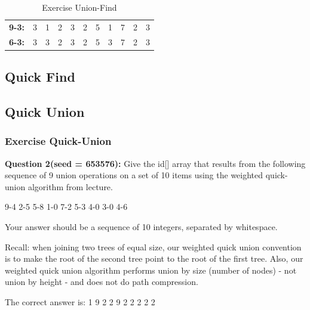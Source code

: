 \documentclass[paper=a4, fontsize=11pt]{scrartcl} %
\numberwithin{equation}{section} %
\numberwithin{figure}{section} %
\numberwithin{table}{section} %
\begin{document}
\begin{table}[]
\begin{tabular}{|c|ccllllllll}
\textbf{9-3:} & 3                      & 1                      & 2                               & 3                               & 2                               & 5                               & 1                               & 7                               & 2                               & 3                               \\ \cline{1-1}
\textbf{6-3:} & 3                      & 3                      & 2                               & 3                               & 2                               & 5                               & 3                               & 7                               & 2                               & 3                               \\ \cline{1-1}
\end{tabular}
\label{tab:union-find}
\caption{Exercise Union-Find}
\end{table}
\subsection{Quick Find}


\subsection{Quick Union}
\subsubsection{Exercise Quick-Union}
\textbf{Question 2(seed = 653576):}
Give the id[] array that results from the following sequence of 9 union
operations on a set of 10 items using the weighted quick-union algorithm from lecture.
\begin{center}
9-4 2-5 5-8 1-0 7-2 5-3 4-0 3-0 4-6 
\end{center}
Your answer should be a sequence of 10 integers, separated by whitespace.

Recall: when joining two trees of equal size, our weighted quick union convention is to
make the root of the second tree point to the root of the first tree. Also, our weighted
quick union algorithm performs union by size (number of nodes) -  not union by height -
and does not do path compression.


The correct answer is: 1 9 2 2 9 2 2 2 2 2
\end{document}
